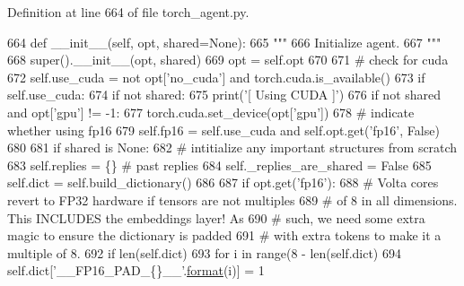 Definition at line 664 of file torch\+\_\+agent.\+py.


\begin{DoxyCode}
664     \textcolor{keyword}{def }\_\_init\_\_(self, opt, shared=None):
665         \textcolor{stringliteral}{"""}
666 \textcolor{stringliteral}{        Initialize agent.}
667 \textcolor{stringliteral}{        """}
668         super().\_\_init\_\_(opt, shared)
669         opt = self.opt
670 
671         \textcolor{comment}{# check for cuda}
672         self.use\_cuda = \textcolor{keywordflow}{not} opt[\textcolor{stringliteral}{'no\_cuda'}] \textcolor{keywordflow}{and} torch.cuda.is\_available()
673         \textcolor{keywordflow}{if} self.use\_cuda:
674             \textcolor{keywordflow}{if} \textcolor{keywordflow}{not} shared:
675                 print(\textcolor{stringliteral}{'[ Using CUDA ]'})
676             \textcolor{keywordflow}{if} \textcolor{keywordflow}{not} shared \textcolor{keywordflow}{and} opt[\textcolor{stringliteral}{'gpu'}] != -1:
677                 torch.cuda.set\_device(opt[\textcolor{stringliteral}{'gpu'}])
678         \textcolor{comment}{# indicate whether using fp16}
679         self.fp16 = self.use\_cuda \textcolor{keywordflow}{and} self.opt.get(\textcolor{stringliteral}{'fp16'}, \textcolor{keyword}{False})
680 
681         \textcolor{keywordflow}{if} shared \textcolor{keywordflow}{is} \textcolor{keywordtype}{None}:
682             \textcolor{comment}{# intitialize any important structures from scratch}
683             self.replies = \{\}  \textcolor{comment}{# past replies}
684             self.\_replies\_are\_shared = \textcolor{keyword}{False}
685             self.dict = self.build\_dictionary()
686 
687             \textcolor{keywordflow}{if} opt.get(\textcolor{stringliteral}{'fp16'}):
688                 \textcolor{comment}{# Volta cores revert to FP32 hardware if tensors are not multiples}
689                 \textcolor{comment}{# of 8 in all dimensions. This INCLUDES the embeddings layer! As}
690                 \textcolor{comment}{# such, we need some extra magic to ensure the dictionary is padded}
691                 \textcolor{comment}{# with extra tokens to make it a multiple of 8.}
692                 \textcolor{keywordflow}{if} len(self.dict) %
693                     \textcolor{keywordflow}{for} i \textcolor{keywordflow}{in} range(8 - len(self.dict) %
694                         self.dict[\textcolor{stringliteral}{'\_\_FP16\_PAD\_\{\}\_\_'}.\hyperlink{namespaceparlai_1_1chat__service_1_1services_1_1messenger_1_1shared__utils_a32e2e2022b824fbaf80c747160b52a76}{format}(i)] = 1

\end{DoxyCode}
